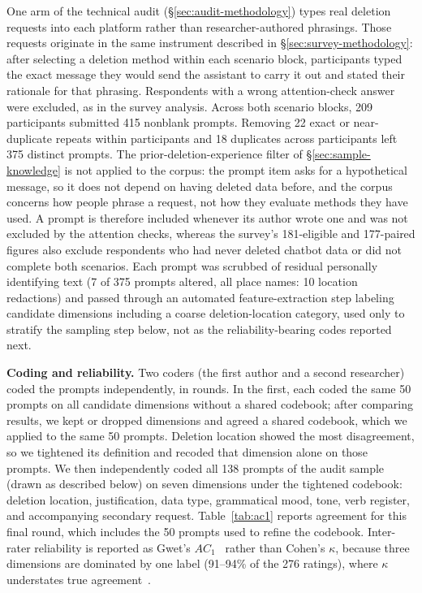 \documentclass[conference,compsoc]{IEEEtran}
\begin{document}
One arm of the technical audit (\S\ref{sec:audit-methodology}) types real
deletion requests into each platform rather than researcher-authored
phrasings. Those requests originate in the same instrument described in
\S\ref{sec:survey-methodology}: after selecting a deletion method within
each scenario block, participants typed the exact message they would send
the assistant to carry it out and stated their rationale for that
phrasing. Respondents with a wrong attention-check answer were
excluded, as in the survey analysis. Across both scenario blocks, 209 participants submitted 415 nonblank prompts. Removing 22 exact or near-duplicate repeats within participants and 18 duplicates across participants left 375 distinct prompts. The prior-deletion-experience filter of
\S\ref{sec:sample-knowledge} is not applied to the corpus: the prompt item
asks for a hypothetical message, so it does not depend on having deleted data
before, and the corpus concerns how people phrase a request, not how they
evaluate methods they have used. A prompt is therefore included whenever its
author wrote one and was not excluded by the attention checks, whereas the survey's
181-eligible and 177-paired figures also exclude respondents who had never
deleted chatbot data or did not complete both scenarios. Each prompt was
scrubbed of residual personally identifying text (7 of 375 prompts
altered, all place names: 10 location redactions) and passed through an
automated feature-extraction step labeling candidate dimensions including
a coarse deletion-location category, used only to stratify the sampling
step below, not as the reliability-bearing codes reported next.

\textbf{Coding and reliability.} Two coders (the first author and a second
researcher) coded the prompts independently, in rounds. In the first, each
coded the same 50 prompts on all candidate dimensions without a shared
codebook; after comparing results, we kept or dropped dimensions and agreed a
shared codebook, which we applied to the same 50 prompts. Deletion location
showed the most disagreement, so we tightened its definition and recoded that
dimension alone on those prompts. We then independently coded all 138 prompts
of the audit sample (drawn as described below) on seven dimensions under the
tightened codebook: deletion location, justification, data type, grammatical
mood, tone, verb register, and accompanying secondary request.
Table~\ref{tab:ac1} reports agreement for this final round, which includes the
50 prompts used to refine the codebook.
Inter-rater reliability is reported as Gwet's $AC_1$~\cite{gwet2008ac1}
rather than Cohen's $\kappa$, because three dimensions are dominated by
one label (91--94\% of the 276 ratings), where $\kappa$ understates true
agreement~\cite{gwet2008ac1,wongpakaran2013comparison}.
\end{document}
